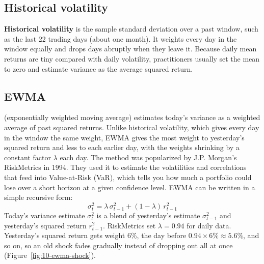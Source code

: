 \subsection{Historical volatility}

\textbf{Historical volatility} is the sample standard deviation over a past window, such as the last 22 trading days (about one month). It weights every day in the window equally and drops days abruptly when they leave it. Because daily mean returns are tiny compared with daily volatility, practitioners usually set the mean to zero and estimate variance as the average squared return.

\subsection{EWMA}


 (exponentially weighted moving average) estimates today's variance as a weighted average of past squared returns. Unlike historical volatility, which gives every day in the window the same weight, EWMA gives the most weight to yesterday's squared return and less to each earlier day, with the weights shrinking by a constant factor $\lambda$ each day. The method was popularized by J.P. Morgan's RiskMetrics in 1994.
They used it to estimate the volatilities and correlations that feed into Value-at-Risk (VaR), which tells you how much a portfolio could lose over a short horizon at a given confidence level.
EWMA can be written in a simple recursive form:
\begin{equation}
  \sigma^2_t = \lambda\,\sigma^2_{t-1} + (1 - \lambda)\,r^2_{t-1}
  \label{eq:10-ewma}
\end{equation}
Today's variance estimate $\sigma^2_t$ is a blend of yesterday's estimate $\sigma^2_{t-1}$ and yesterday's squared return $r^2_{t-1}$.
RiskMetrics set $\lambda = 0.94$ for daily data. Yesterday's squared return gets weight 6\%, the day before $0.94 \times 6\% \approx 5.6\%$, and so on, so an old shock fades gradually instead of dropping out all at once (Figure~\ref{fig:10-ewma-shock}).


